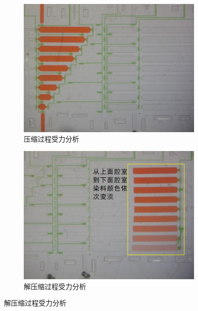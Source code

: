 	\begin{figure}[!htp]
	\centering
	  \begin{subfigure}{0.45\textwidth}
		\centering
		\includegraphics[width=1\linewidth]{figure/chap2/before.jpg}
		\caption{压缩过程受力分析}
		\label{fig:before}   
	  \end{subfigure}
		\hspace{1em}
	  \begin{subfigure}{0.45\textwidth}
		\centering
		\includegraphics[width=1\linewidth]{figure/chap2/after.png}
		\caption{解压缩过程受力分析}
		\label{fig:after}
	  \end{subfigure}
	  \label{fig:force}
	\end{figure}
